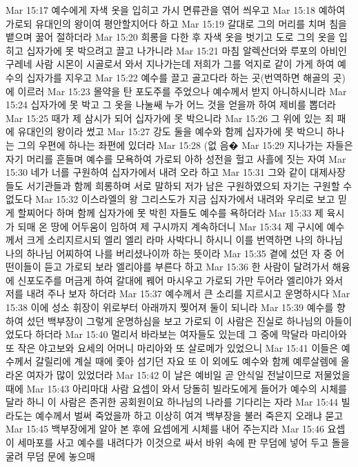 Mar 15:17  예수에게 자색 옷을 입히고 가시 면류관을 엮어 씌우고
Mar 15:18  예하여 가로되 유대인의 왕이여 평안할지어다 하고
Mar 15:19  갈대로 그의 머리를 치며 침을 뱉으며 꿇어 절하더라
Mar 15:20  희롱을 다한 후 자색 옷을 벗기고 도로 그의 옷을 입히고 십자가에 못 박으려고 끌고 나가니라
Mar 15:21  마침 알렉산더와 루포의 아비인 구레네 사람 시몬이 시골로서 와서 지나가는데 저희가 그를 억지로 같이 가게 하여 예수의 십자가를 지우고
Mar 15:22  예수를 끌고 골고다라 하는 곳(번역하면 해골의 곳)에 이르러
Mar 15:23  몰약을 탄 포도주를 주었으나 예수께서 받지 아니하시니라
Mar 15:24  십자가에 못 박고 그 옷을 나눌쌔 누가 어느 것을 얻을까 하여 제비를 뽑더라
Mar 15:25  때가 제 삼시가 되어 십자가에 못 박으니라
Mar 15:26  그 위에 있는 죄 패에 유대인의 왕이라 썼고
Mar 15:27  강도 둘을 예수와 함께 십자가에 못 박으니 하나는 그의 우편에 하나는 좌편에 있더라
Mar 15:28  (없 음�
Mar 15:29  지나가는 자들은 자기 머리를 흔들며 예수를 모욕하여 가로되 아하 성전을 헐고 사흘에 짓는 자여
Mar 15:30  네가 너를 구원하여 십자가에서 내려 오라 하고
Mar 15:31  그와 같이 대제사장들도 서기관들과 함께 희롱하며 서로 말하되 저가 남은 구원하였으되 자기는 구원할 수 없도다
Mar 15:32  이스라엘의 왕 그리스도가 지금 십자가에서 내려와 우리로 보고 믿게 할찌어다 하며 함께 십자가에 못 박힌 자들도 예수를 욕하더라
Mar 15:33  제 육시가 되매 온 땅에 어두움이 임하여 제 구시까지 계속하더니
Mar 15:34  제 구시에 예수께서 크게 소리지르시되 엘리 엘리 라마 사박다니 하시니 이를 번역하면 나의 하나님 나의 하나님 어찌하여 나를 버리셨나이까 하는 뜻이라
Mar 15:35  곁에 섰던 자 중 어떤이들이 듣고 가로되 보라 엘리야를 부른다 하고
Mar 15:36  한 사람이 달려가서 해융에 신포도주를 머금게 하여 갈대에 꿰어 마시우고 가로되 가만 두어라 엘리야가 와서 저를 내려 주나 보자 하더라
Mar 15:37  예수께서 큰 소리를 지르시고 운명하시다
Mar 15:38  이에 성소 휘장이 위로부터 아래까지 찢어져 둘이 되니라
Mar 15:39  예수를 향하여 섰던 백부장이 그렇게 운명하심을 보고 가로되 이 사람은 진실로 하나님의 아들이었도다 하더라
Mar 15:40  멀리서 바라보는 여자들도 있는데 그 중에 막달라 마리아와 또 작은 야고보와 요세의 어머니 마리아와 또 살로메가 있었으니
Mar 15:41  이들은 예수께서 갈릴리에 계실 때에 좇아 섬기던 자요 또 이 외에도 예수와 함께 예루살렘에 올라온 여자가 많이 있었더라
Mar 15:42  이 날은 예비일 곧 안식일 전날이므로 저물었을 때에
Mar 15:43  아리마대 사람 요셉이 와서 당돌히 빌라도에게 들어가 예수의 시체를 달라 하니 이 사람은 존귀한 공회원이요 하나님의 나라를 기다리는 자라
Mar 15:44  빌라도는 예수께서 벌써 죽었을까 하고 이상히 여겨 백부장을 불러 죽은지 오래냐 묻고
Mar 15:45  백부장에게 알아 본 후에 요셉에게 시체를 내어 주는지라
Mar 15:46  요셉이 세마포를 사고 예수를 내려다가 이것으로 싸서 바위 속에 판 무덤에 넣어 두고 돌을 굴려 무덤 문에 놓으매
